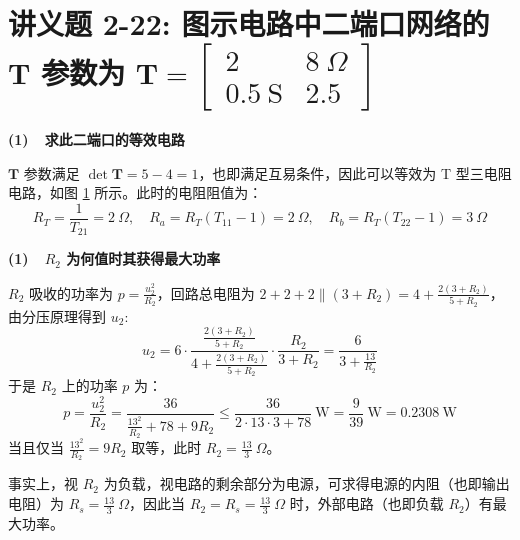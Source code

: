 \documentclass[UTF8]{report}
\theoremstyle{MyLineTheoremStyle} %
\theoremstyle{MyBlockTheoremStyle} %
\theoremstyle{MySubsubsectionStyle} %
\begin{document}
\section{讲义题 2-22: 图示电路中二端口网络的 $\boldsymbol{T}$ 参数为 $\boldsymbol{T} = \begin{bmatrix} 2 & 8\  \Omega \\ 0.5\ \mathrm{S} & 2.5 \end{bmatrix} $}

\noindent \textbf{(1)\ \ 求此二端口的等效电路}

$\boldsymbol{T}$ 参数满足 $\det \boldsymbol{T} = 5 - 4 = 1$，也即满足互易条件，因此可以等效为 T 型三电阻电路，如图 \ref{} 所示。此时的电阻阻值为：
\begin{equation}
R_T = \frac{1}{T_{21}} = 2 \ \Omega,\quad R_a = R_T(T_{11} - 1) = 2\ \Omega,\quad R_b = R_T(T_{22} - 1) = 3\ \Omega
\end{equation}

\noindent \textbf{(1)\ \ $R_2$ 为何值时其获得最大功率}

$R_2$ 吸收的功率为 $p = \frac{u_2^2}{R_2}$，回路总电阻为 $2 + 2 + 2 \parallel (3 + R_2) = 4 + \frac{2(3+R_2)}{5+R_2}$，由分压原理得到 $u_2$:
\begin{equation}
u_2 = 6\cdot \frac{\frac{2(3+R_2)}{5+R_2}}{4 + \frac{2(3+R_2)}{5+R_2}} \cdot \frac{R_2}{ 3 + R_2} = \frac{6}{3+\frac{13}{R_2}}
\end{equation}
于是 $R_2$ 上的功率 $p$ 为：
\begin{equation}
p = \frac{u_2^2}{R_2} = \frac{36}{\frac{13^2}{R_2} + 78 + 9R_2} \leqslant \frac{36}{2\cdot 13 \cdot 3 + 78} \ \mathrm{W} = \frac{9}{39}\ \mathrm{W} = 0.2308 \ \mathrm{W}
\end{equation}
当且仅当 $\frac{13^2}{R_2} = 9R_2$ 取等，此时 $R_2 = \frac{13}{3}\ \Omega$。

事实上，视 $R_2$ 为负载，视电路的剩余部分为电源，可求得电源的内阻（也即输出电阻）为 $R_s = \frac{13}{3}\ \Omega$，因此当 $R_2 = R_s =  \frac{13}{3}\ \Omega$ 时，外部电路（也即负载 $R_2$）有最大功率。 
\end{document}

